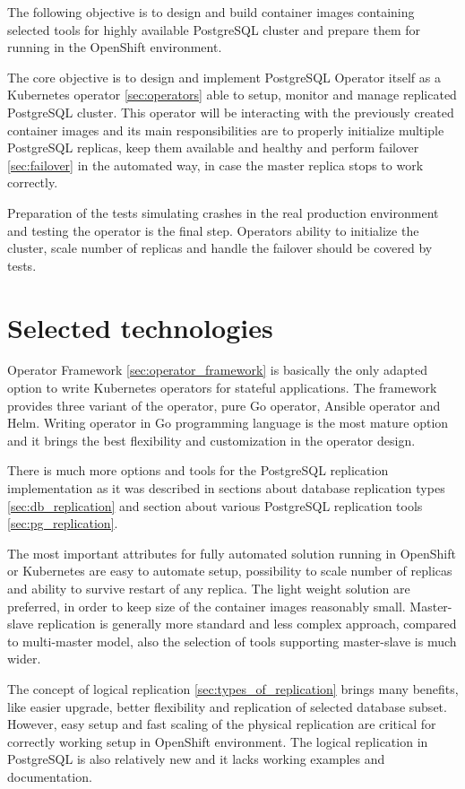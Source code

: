 \documentclass[
  digital, %
  twoside, %
  table,   %
  lof,     %
  lot,     %
]{fithesis3}
\begin{document}
The following objective is to design and build container images containing selected tools for highly available PostgreSQL cluster and prepare them for running in the OpenShift environment.

The core objective is to design and implement PostgreSQL Operator itself as a Kubernetes operator \ref{sec:operators} able to setup, monitor and manage replicated PostgreSQL cluster. This operator will be interacting with the previously created container images and its main responsibilities are to properly initialize multiple PostgreSQL replicas, keep them available and healthy and perform failover \ref{sec:failover} in the automated way, in case the master replica stops to work correctly.

Preparation of the tests simulating crashes in the real production environment and testing the operator is the final step. Operators ability to initialize the cluster, scale number of replicas and handle the failover should be covered by tests.

\section{Selected technologies}
Operator Framework \ref{sec:operator_framework} is basically the only adapted option to write Kubernetes operators for stateful applications. The framework provides three variant of the operator, pure Go operator, Ansible operator and Helm. Writing operator in Go programming language is the most mature option and it brings the best flexibility and customization in the operator design.

There is much more options and tools for the PostgreSQL replication implementation as it was described in sections about database replication types \ref{sec:db_replication} and section about various PostgreSQL replication tools \ref{sec:pg_replication}.

The most important attributes for fully automated solution running in OpenShift or Kubernetes are easy to automate setup, possibility to scale number of replicas and ability to survive restart of any replica. The light weight solution are preferred, in order to keep size of the container images reasonably small. Master-slave replication is generally more standard and less complex approach, compared to multi-master model, also the selection of tools supporting master-slave is much wider.

The concept of logical replication \ref{sec:types_of_replication} brings many benefits, like easier upgrade, better flexibility and replication of selected database subset. However, easy setup and fast scaling of the physical replication are critical for correctly working setup in OpenShift environment. The logical replication in PostgreSQL is also relatively new and it lacks working examples and documentation.
\end{document}
